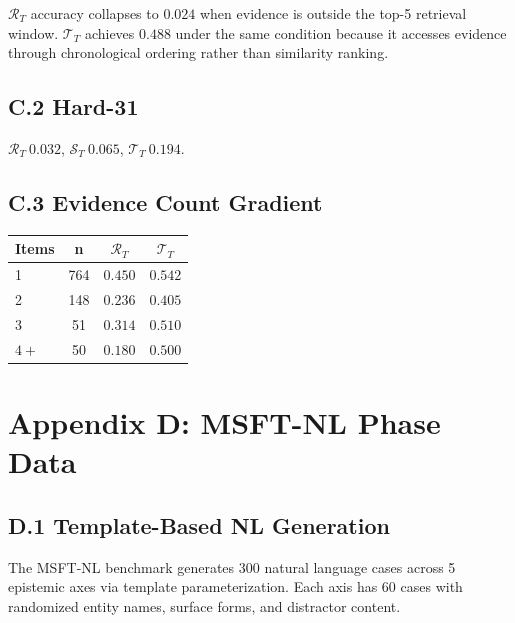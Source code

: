 \documentclass[letterpaper,twocolumn,10pt]{article}
\begin{document}
$\mathcal{R}_T$ accuracy collapses to $0.024$ when evidence is outside the top-5 retrieval window.%
$\mathcal{T}_T$ achieves $0.488$ under the same condition because it accesses evidence through chronological ordering rather than similarity ranking.%

\subsection*{C.2 Hard-31}
$\mathcal{R}_T\ 0.032$, $\mathcal{S}_T\ 0.065$, $\mathcal{T}_T\ 0.194$.

\subsection*{C.3 Evidence Count Gradient}
\begin{table}[h]
\centering\footnotesize
\begin{tabular}{lccc}
\toprule
Items & n & $\mathcal{R}_T$ & $\mathcal{T}_T$\\
\midrule
1 & 764 & $0.450$ & $0.542$\\
2 & 148 & $0.236$ & $0.405$\\
3 & 51 & $0.314$ & $0.510$\\
$4+$ & 50 & $0.180$ & $0.500$\\
\bottomrule
\end{tabular}
\end{table}

\section*{Appendix D: MSFT-NL Phase Data}
\subsection*{D.1 Template-Based NL Generation}
The MSFT-NL benchmark generates 300 natural language cases across 5 epistemic axes via template parameterization. Each axis has 60 cases with randomized entity names, surface forms, and distractor content.

\begin{table}[h]
\centering
{}
\end{table}
\end{document}
